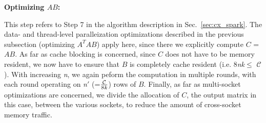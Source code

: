     




\vspace*{0.1in} 
{\bf{{ {Optimizing $AB$:}}}}

    This step refers to Step 7 in the algorithm description in
    Sec.~\ref{sec:cx_spark}. The data- and thread-level paralleization optimizations described 
    in the previous subsection (optimizing $A^TAB$) apply here, since
    there we explicitly  compute $C$ = $AB$. As far as cache blocking is
    concerned, since $C$ does not have to be memory resident, we now have
    to ensure that $B$ is completely cache resident (i.e. 8{\it{nk}}$\le$
    $\mathcal{C}$). With increasing {\it{n}}, we again peform the
    computation in multiple rounds, with each round operating on 
    {\it{ {\it{n}}$'$}} (=$\frac{\mathcal{C}}{8\it{k}}$) rows of $B$.
    Finally, as far as multi-socket optimizations are concerned, we
    divide the allocation of $C$, the output matrix in this case,
    between the various sockets, to reduce the amount of cross-socket
    memory traffic.


